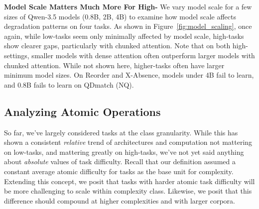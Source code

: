 
\textbf{Model Scale Matters Much More For High-\cname} We vary model scale for a few sizes of Qwen-3.5 models (0.8B, 2B, 4B) to examine how model scale affects degradation patterns on four tasks. As shown in Figure~\ref{fig:model_scaling}, once again, while low-\cname tasks seem only minimally affected by model scale, high-\cname tasks show clearer gaps, particularly with chunked attention.  Note that on both high-\cname settings, smaller models with dense attention often outperform larger models with chunked attention.  While not shown here, higher-\cname tasks often have larger minimum model sizes. On Reorder and X-Absence, models under 4B fail to learn, and 0.8B fails to learn on QDmatch (NQ).


\subsection{Analyzing Atomic Operations}

So far, we've largely considered tasks at the \cname class granularity. While this has shown a consistent \emph{relative} trend of architectures and computation not mattering on low-\cname tasks, and mattering greatly on high-\cname tasks, we've not yet said anything about \emph{absolute} values of task difficulty. Recall that our \cname definition assumed a constant average atomic difficulty for tasks as the base unit for complexity. Extending this concept, we posit that tasks with harder atomic task difficulty will be more challenging to scale within complexity class. Likewise, we posit that this difference should compound at higher complexities and with larger corpora.


